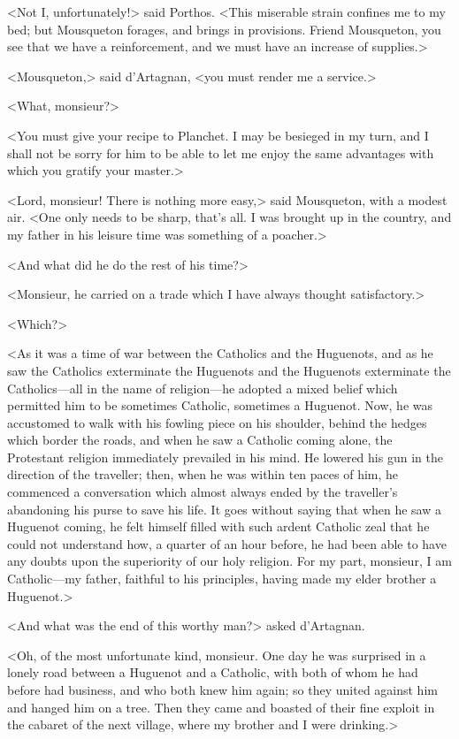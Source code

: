 <Not I, unfortunately!> said Porthos. <This miserable strain confines me to my bed; but Mousqueton forages, and brings in provisions. Friend Mousqueton, you see that we have a reinforcement, and we must have an increase of supplies.> 

<Mousqueton,> said d'Artagnan, <you must render me a service.> 

<What, monsieur?> 

<You must give your recipe to Planchet. I may be besieged in my turn, and I shall not be sorry for him to be able to let me enjoy the same advantages with which you gratify your master.> 

<Lord, monsieur! There is nothing more easy,> said Mousqueton, with a modest air. <One only needs to be sharp, that's all. I was brought up in the country, and my father in his leisure time was something of a poacher.> 

<And what did he do the rest of his time?> 

<Monsieur, he carried on a trade which I have always thought satisfactory.> 

<Which?> 

<As it was a time of war between the Catholics and the Huguenots, and as he saw the Catholics exterminate the Huguenots and the Huguenots exterminate the Catholics---all in the name of religion---he adopted a mixed belief which permitted him to be sometimes Catholic, sometimes a Huguenot. Now, he was accustomed to walk with his fowling piece on his shoulder, behind the hedges which border the roads, and when he saw a Catholic coming alone, the Protestant religion immediately prevailed in his mind. He lowered his gun in the direction of the traveller; then, when he was within ten paces of him, he commenced a conversation which almost always ended by the traveller's abandoning his purse to save his life. It goes without saying that when he saw a Huguenot coming, he felt himself filled with such ardent Catholic zeal that he could not understand how, a quarter of an hour before, he had been able to have any doubts upon the superiority of our holy religion. For my part, monsieur, I am Catholic---my father, faithful to his principles, having made my elder brother a Huguenot.> 

<And what was the end of this worthy man?> asked d'Artagnan. 

<Oh, of the most unfortunate kind, monsieur. One day he was surprised in a lonely road between a Huguenot and a Catholic, with both of whom he had before had business, and who both knew him again; so they united against him and hanged him on a tree. Then they came and boasted of their fine exploit in the cabaret of the next village, where my brother and I were drinking.> 

